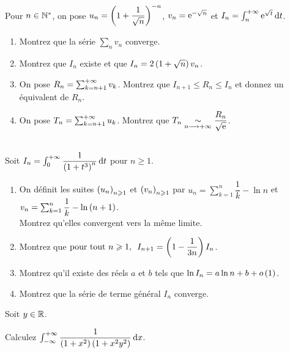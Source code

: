 \begin{exo}~\\
Pour \(n\in\mathbb{N}^*\), on pose \(u_n=\left(1+\dfrac{1}{\sqrt{n}}\right)^{-n}\), \(v_n=\mathrm{e}^{-\sqrt{n}}\) et \(I_n=\int_n^{\pinf}\e{\sqrt{t}}\odif{t}\).

\begin{enumerate}
    \item Montrez que la série \(\sum_nv_n\) converge. \\
    \item Montrez que \(I_n\) existe et que \(I_n=2\left(1+\sqrt{n}\right)v_n\). \\
    \item On pose \(R_n=\sum_{k=n+1}^{+\infty}v_k\). Montrez que \(I_{n+1}\leq R_n\leq I_n\) et donnez un équivalent de \(R_n\). \\
    \item On pose \(T_n=\sum_{k=n+1}^{+\infty}u_k\). Montrez que \(T_n\underset{n\longrightarrow+\infty}{\sim}\dfrac{R_n}{\sqrt{\mathrm{e}^{}}}\).
\end{enumerate}
\end{exo}

\begin{exo}~\\
Soit \(I_n=\int_0^{\pinf}\dfrac{1}{\paren{1+t^3}^n}\odif{t}\) pour \(n\geq1\).

\begin{enumerate}
    \item On définit les suites \(\left(u_n\right)_{n\geqslant1}\) et \(\left(v_n\right)_{n\geqslant1}\) par \(u_n=\sum_{k=1}^n\dfrac{1}{k}-\ln n\) et \(v_n=\sum_{k=1}^n\dfrac{1}{k}-\ln\left(n+1\right)\). \\ Montrez qu'elles convergent vers la même limite. \\
    \item Montrez que \(\quantifs{\tpt n\geq1}I_{n+1}=\paren{1-\dfrac{1}{3n}}I_n\). \\
    \item Montrez qu'il existe des réels \(a\) et \(b\) tels que \(\ln I_n=a\ln n+b+o\left(1\right)\). \\
    \item Montrez que la série de terme général \(I_n\) converge.
\end{enumerate}
\end{exo}

\begin{exo}
Soit \(y\in\mathbb{R}\).

Calculez \(\int_{\minf}^{\pinf}\dfrac{1}{\paren{1+x^2}\paren{1+x^2y^2}}\odif{x}\).
\end{exo}

